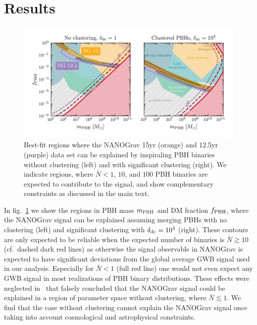\section{Results} \label{sec:PBHresults}

\begin{figure}[t]
	\centering
	\includegraphics[width=\textwidth]{thesisplots/pbh/pbh_02_corrected.jpg}
	\caption{Best-fit regions where the \ac{NANOGrav} 15yr (orange) and 12.5yr (purple) data set can be explained by inspiraling \ac{PBH} binaries without clustering (left) and with significant clustering (right). We indicate regions, where $\bar{N} < 1$, $10$, and $100$ \ac{PBH} binaries are expected to contribute to the signal, and show complementary constraints as discussed in the main text.}
	\label{fig:res_explanation}
\end{figure}


In fig.~\ref{fig:res_explanation} we   show the regions in \ac{PBH} mass $m_{\mathrm{PBH}}$ and DM fraction $f_{\mathrm{PBH}}$, where the \ac{NANOGrav} signal can be explained assuming merging \acp{PBH} with no clustering (left) and significant clustering with $\delta_{\mathrm{dc}} = 10^3$ (right). These contours are only expected to be reliable when the expected number of binaries is $\bar{N} \gtrsim 10$ (cf.~dashed dark red lines) as otherwise the signal  observable in \ac{NANOGrav} is expected to have significant deviations from the global average \ac{GWB} signal used in our analysis. Especially for $\bar{N} < 1$ (full red line) one would not even expect any \ac{GWB} signal in most realizations of \ac{PBH} binary distributions. These effects were neglected in~\cite{Atal:2020yic} that falsely concluded that the \ac{NANOGrav} signal could be explained in a region of parameter space without clustering, where $\bar{N} \lesssim 1$. We find that the case without clustering cannot explain the \ac{NANOGrav} signal once taking into account cosmological and astrophysical constraints.

